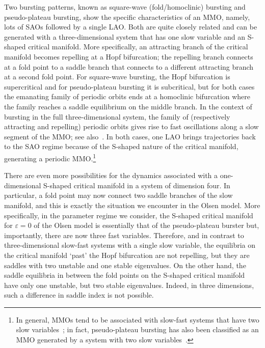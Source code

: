 \documentclass{ws-ijbc}
\begin{document}
Two bursting patterns, known as square-wave (fold/homoclinic) bursting and pseudo-plateau bursting, show the specific characteristics of an MMO, namely, lots of SAOs followed by a single LAO. Both are quite closely related \cite{osta-dcds} and can be generated with a three-dimensional system that has one slow variable and an S-shaped critical manifold. More specifically, an attracting branch of the critical manifold becomes repelling at a Hopf bifurcation; the repelling branch connects at a fold point to a saddle branch that connects to a different attracting branch at a second fold point. For square-wave bursting, the Hopf bifurcation is supercritical and for pseudo-plateau bursting it is subcritical, but for both cases the emanating family of periodic orbits ends at a homoclinic bifurcation where the family reaches a saddle equilibrium on the middle branch. In the context of bursting in the full three-dimensional system, the family of (respectively attracting and repelling) periodic orbits gives rise to fast oscillations along a slow segment of the MMO; see also~\cite{bertram95, osta-dcds, sols-bmb}. In both cases, one LAO brings trajectories back to the SAO regime because of the S-shaped nature of the critical manifold, generating a periodic MMO.\footnote{In general, MMOs tend to be associated with slow-fast systems that have two slow variables~\cite{vdp2, MMO, vdp1, Autocatalator, SW, Wech2005}; in fact, pseudo-plateau bursting has also been classified as an MMO generated by a system with two slow variables~\cite{Vo_paper}.}

There are even more possibilities for the dynamics associated with a one-dimensional S-shaped critical manifold in a system of dimension four. In particular, a fold point may now connect two saddle branches of the slow manifold, and this is exactly the situation we encounter in the Olsen model. More specifically, in the parameter regime we consider, the S-shaped critical manifold for $\varepsilon = 0$ of the Olsen model is essentially that of the pseudo-plateau burster but, importantly, there are now three fast variables. Therefore, and in contrast to three-dimensional slow-fast systems with a single slow variable, the equilibria on the critical manifold `past' the Hopf bifurcation are not repelling, but they are saddles with two unstable and one stable eigenvalues. On the other hand, the saddle equilibria in between the fold points on the S-shaped critical manifold have only one unstable, but two stable eigenvalues. Indeed, in three dimensions, such a difference in saddle index is not possible. 
\end{document}
